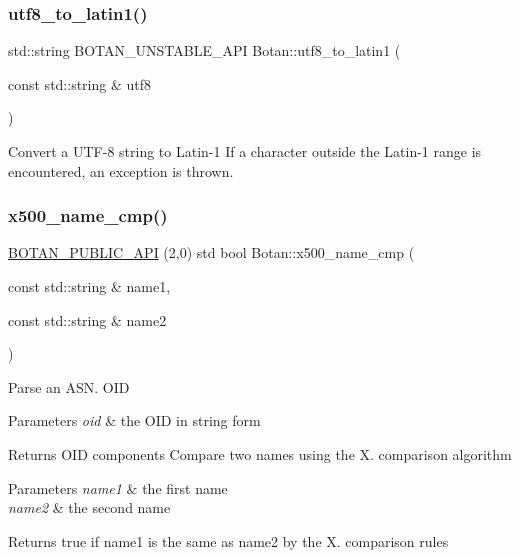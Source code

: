 \subsubsection{\texorpdfstring{utf8\+\_\+to\+\_\+latin1()}{utf8\_to\_latin1()}}
{\footnotesize\ttfamily std\+::string B\+O\+T\+A\+N\+\_\+\+U\+N\+S\+T\+A\+B\+L\+E\+\_\+\+A\+PI Botan\+::utf8\+\_\+to\+\_\+latin1 (\begin{DoxyParamCaption}\item[{const std\+::string \&}]{utf8 }\end{DoxyParamCaption})}

Convert a U\+T\+F-\/8 string to Latin-\/1 If a character outside the Latin-\/1 range is encountered, an exception is thrown. \mbox{\label{namespace_botan_ae43dddd33284374ef3b8c4e2fe8b8a95}} 
\subsubsection{\texorpdfstring{x500\+\_\+name\+\_\+cmp()}{x500\_name\_cmp()}}
{\footnotesize\ttfamily \hyperlink{namespace_botan_a6b9388030d872e586a4655b776ac9501}{B\+O\+T\+A\+N\+\_\+\+P\+U\+B\+L\+I\+C\+\_\+\+A\+PI} (2,0) std bool Botan\+::x500\+\_\+name\+\_\+cmp (\begin{DoxyParamCaption}\item[{const std\+::string \&}]{name1,  }\item[{const std\+::string \&}]{name2 }\end{DoxyParamCaption})}

Parse an A\+S\+N. O\+ID 
\begin{DoxyParams}{Parameters}
{\em oid} & the O\+ID in string form \\
\hline
\end{DoxyParams}
\begin{DoxyReturn}{Returns}
O\+ID components Compare two names using the X. comparison algorithm 
\end{DoxyReturn}

\begin{DoxyParams}{Parameters}
{\em name1} & the first name \\
\hline
{\em name2} & the second name \\
\hline
\end{DoxyParams}
\begin{DoxyReturn}{Returns}
true if name1 is the same as name2 by the X. comparison rules 
\end{DoxyReturn}
\mbox{\label{namespace_botan_a9c8197d5fc973d59ae216ca5f865be55}} 
